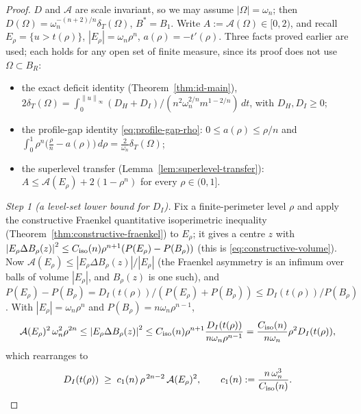 \documentclass[11pt]{amsart}
\theoremstyle{definition}
\newcommand{\Om}{\Omega}
\newcommand{\Fr}{\mathcal A}
\newcommand{\dT}{\delta_T}
\newcommand{\abs}[1]{\left|#1\right|}
\newcommand{\norm}[1]{\left\|#1\right\|}
\newcommand{\Per}{P}
\begin{document}
\begin{proof}
$D$ and $\Fr$ are scale invariant, so we may assume $\abs\Om=\omega_n$; then
$D(\Om)=\omega_n^{-(n+2)/n}\dT(\Om)$, $B^*=B_1$. Write $A:=\Fr(\Om)\in[0,2)$,
and recall $E_\rho=\{u>t(\rho)\}$, $\abs{E_\rho}=\omega_n\rho^n$,
$a(\rho)=-t'(\rho)$. Three facts proved earlier are used; each holds for any
open set of finite measure, since its proof does not use $\Om\subset B_R$:
\begin{itemize}
\item[(a)] the exact deficit identity (Theorem~\ref{thm:id-main}),
$2\dT(\Om)=\int_0^{\norm u_\infty}(D_H+D_I)/(n^2\omega_n^{2/n}m^{1-2/n})\,dt$,
with $D_H,D_I\ge0$;
\item[(b)] the profile-gap identity \eqref{eq:profile-gap-rho}:
$0\le a(\rho)\le\rho/n$ and
$\int_0^1\rho^n\bigl(\tfrac\rho n-a(\rho)\bigr)\,d\rho=\tfrac2{\omega_n}\dT(\Om)$;
\item[(c)] the superlevel transfer (Lemma~\ref{lem:superlevel-transfer}):
$A\le\Fr(E_\rho)+2(1-\rho^n)$ for every $\rho\in(0,1]$.
\end{itemize}

\emph{Step 1 (a level-set lower bound for $D_I$).}
Fix a finite-perimeter level $\rho$ and apply the constructive Fraenkel
quantitative isoperimetric inequality (Theorem~\ref{thm:constructive-fraenkel})
to $E_\rho$; it gives a centre $z$ with
$\abs{E_\rho\Delta B_\rho(z)}^2\le C_{\rm iso}(n)\rho^{n+1}
(\Per(E_\rho)-\Per(B_\rho))$ (this is \eqref{eq:constructive-volume}).
Now $\Fr(E_\rho)\le\abs{E_\rho\Delta B_\rho(z)}/\abs{E_\rho}$ (the Fraenkel
asymmetry is an infimum over balls of volume $\abs{E_\rho}$, and $B_\rho(z)$
is one such), and
$\Per(E_\rho)-\Per(B_\rho)=D_I(t(\rho))/(\Per(E_\rho)+\Per(B_\rho))\le
D_I(t(\rho))/\Per(B_\rho)$. With $\abs{E_\rho}=\omega_n\rho^n$ and
$\Per(B_\rho)=n\omega_n\rho^{n-1}$,
\[
   \Fr(E_\rho)^2\,\omega_n^2\rho^{2n}\le\abs{E_\rho\Delta B_\rho(z)}^2
   \le C_{\rm iso}(n)\rho^{n+1}\frac{D_I(t(\rho))}{n\omega_n\rho^{n-1}}
   =\frac{C_{\rm iso}(n)}{n\omega_n}\rho^2 D_I(t(\rho)),
\]
which rearranges to
\begin{equation}\label{eq:seed-FJ}
   D_I(t(\rho))\;\ge\;c_1(n)\,\rho^{\,2n-2}\,\Fr(E_\rho)^2,
   \qquad c_1(n):=\frac{n\,\omega_n^{3}}{C_{\rm iso}(n)} .
\end{equation}


\end{proof}
\end{document}
